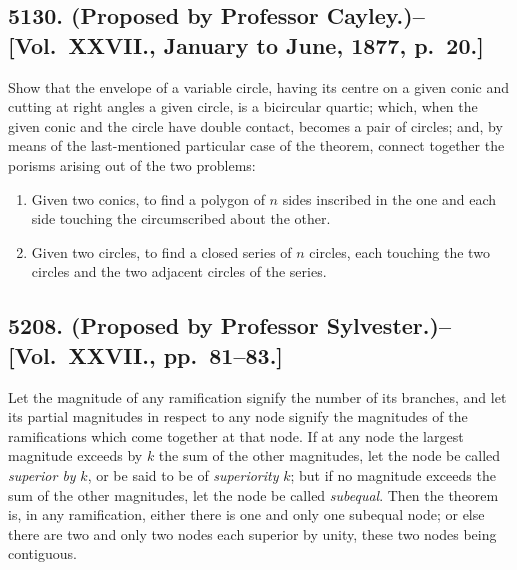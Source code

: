 \documentclass[11pt,a4paper]{book}
\begin{document}
\newpage

\subsection*{5130. (Proposed by Professor Cayley.)\---[Vol.~XXVII., January to June, 1877, p.~20.]}

Show that the envelope of a variable circle, having its centre on a given conic and cutting at right angles a given circle, is a bicircular quartic; which, when the given conic and the circle have double contact, becomes a pair of circles; and, by means of the last-mentioned particular case of the theorem, connect together the porisms arising out of the two problems:
\begin{enumerate}[label=(\roman*)]
\item Given two conics, to find a polygon of $n$ sides inscribed in the one and each side touching the circumscribed about the other.
\item Given two circles, to find a closed series of $n$ circles, each touching the two circles and the two adjacent circles of the series.
\end{enumerate}

\subsection*{5208. (Proposed by Professor Sylvester.)\---[Vol.~XXVII., pp.~81--83.]}

Let the magnitude of any ramification signify the number of its branches, and let its partial magnitudes in respect to any node signify the magnitudes of the ramifications which come together at that node. If at any node the largest magnitude exceeds by $k$ the sum of the other magnitudes, let the node be called \textit{superior by} $k$, or be said to be of \textit{superiority} $k$; but if no magnitude exceeds the sum of the other magnitudes, let the node be called \textit{subequal}. Then the theorem is, in any ramification, either there is one and only one subequal node; or else there are two and only two nodes each superior by unity, these two nodes being contiguous.
\end{document}
